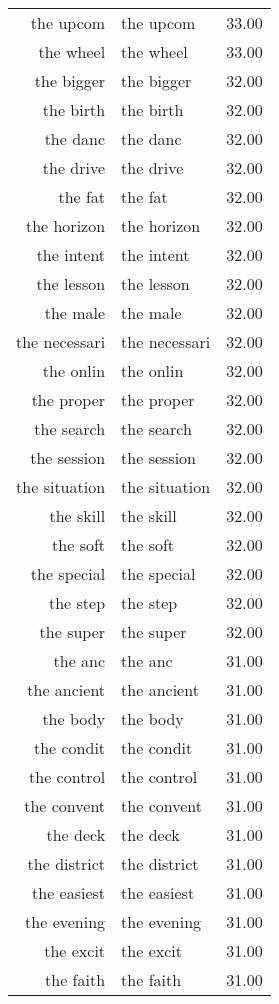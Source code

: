 \begin{table}[ht]
\begin{tabular}{rlr}
  the upcom & the upcom & 33.00 \\ 
  the wheel & the wheel & 33.00 \\ 
  the bigger & the bigger & 32.00 \\ 
  the birth & the birth & 32.00 \\ 
  the danc & the danc & 32.00 \\ 
  the drive & the drive & 32.00 \\ 
  the fat & the fat & 32.00 \\ 
  the horizon & the horizon & 32.00 \\ 
  the intent & the intent & 32.00 \\ 
  the lesson & the lesson & 32.00 \\ 
  the male & the male & 32.00 \\ 
  the necessari & the necessari & 32.00 \\ 
  the onlin & the onlin & 32.00 \\ 
  the proper & the proper & 32.00 \\ 
  the search & the search & 32.00 \\ 
  the session & the session & 32.00 \\ 
  the situation & the situation & 32.00 \\ 
  the skill & the skill & 32.00 \\ 
  the soft & the soft & 32.00 \\ 
  the special & the special & 32.00 \\ 
  the step & the step & 32.00 \\ 
  the super & the super & 32.00 \\ 
  the anc & the anc & 31.00 \\ 
  the ancient & the ancient & 31.00 \\ 
  the body & the body & 31.00 \\ 
  the condit & the condit & 31.00 \\ 
  the control & the control & 31.00 \\ 
  the convent & the convent & 31.00 \\ 
  the deck & the deck & 31.00 \\ 
  the district & the district & 31.00 \\ 
  the easiest & the easiest & 31.00 \\ 
  the evening & the evening & 31.00 \\ 
  the excit & the excit & 31.00 \\ 
  the faith & the faith & 31.00 \\ 

\end{tabular}
\end{table}
